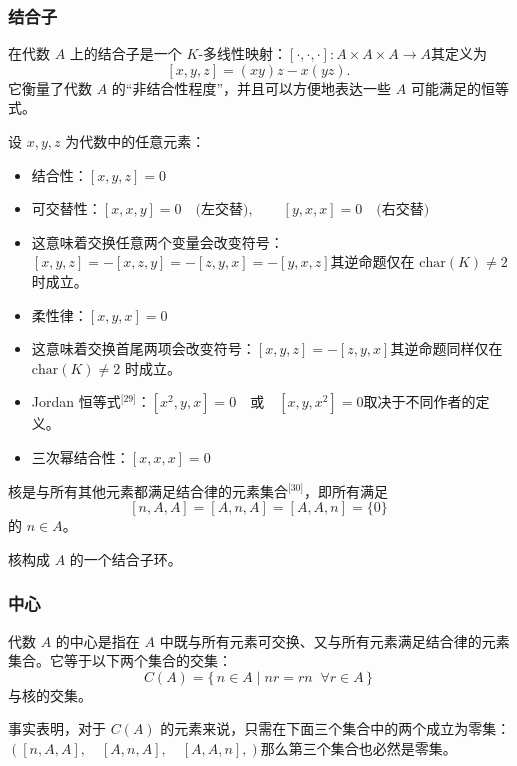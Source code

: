 \subsubsection{结合子}
在代数 $A$ 上的结合子是一个 $K$-多线性映射：$[\cdot,\cdot,\cdot] : A \times A \times A \to A$其定义为
$$
[x,y,z] = (xy)z - x(yz).~
$$
它衡量了代数 $A$ 的“非结合性程度”，并且可以方便地表达一些 $A$ 可能满足的恒等式。

设 $x, y, z$ 为代数中的任意元素：

\begin{itemize}
\item 结合性：$[x,y,z] = 0$
\item 可交替性：$[x,x,y] = 0 \quad \text{(左交替)}, \qquad [y,x,x] = 0 \quad \text{(右交替)}$
\item 这意味着交换任意两个变量会改变符号：$[x,y,z] = -[x,z,y] = -[z,y,x] = -[y,x,z]$其逆命题仅在 $\mathrm{char}(K) \neq 2$ 时成立。
\item 柔性律：$[x,y,x] = 0$
\item 这意味着交换首尾两项会改变符号：$[x,y,z] = -[z,y,x]$其逆命题同样仅在 $\mathrm{char}(K) \neq 2$ 时成立。
\item Jordan 恒等式\(^\text{[29]}\)：$[x^2,y,x] = 0 \quad \text{或} \quad [x,y,x^2] = 0$取决于不同作者的定义。
\item 三次幂结合性：$[x,x,x] = 0$
\end{itemize}
核是与所有其他元素都满足结合律的元素集合\(^\text{[30]}\)，即所有满足
  $$
  [n,A,A] = [A,n,A] = [A,A,n] = \{0\}~
  $$
的 $n \in A$。

核构成 $A$ 的一个结合子环。
\subsubsection{中心}
代数 $A$ 的中心是指在 $A$ 中既与所有元素可交换、又与所有元素满足结合律的元素集合。它等于以下两个集合的交集：
$$
C(A) = \{\, n \in A \mid nr = rn \;\; \forall r \in A \,\}~
$$
与核的交集。

事实表明，对于 $C(A)$ 的元素来说，只需在下面三个集合中的两个成立为零集：$([n, A, A], \quad [A, n, A], \quad [A, A, n],)$那么第三个集合也必然是零集。
